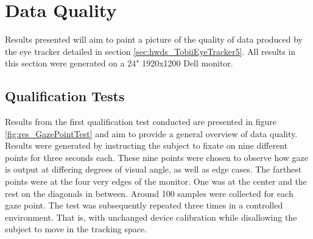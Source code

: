 \section{Data Quality} \label{sec:res_DataQuality}


Results presented will aim to paint a picture of the quality of data produced by the eye tracker detailed in section \ref{sec:hwds_TobiiEyeTracker5}. All results in this section were generated on a 24" 1920x1200 Dell monitor.

\subsection{Qualification Tests}

Results from the first qualification test conducted are presented in figure \ref{fig:res_GazePointTest} and aim to provide a general overview of data quality. Results were generated by instructing the subject to fixate on nine different points for three seconds each. These nine points were chosen to observe how gaze is output at differing degrees of visual angle, as well as edge cases. The farthest points were at the four very edges of the monitor. One was at the center and the rest on the diagonals in between. Around 100 samples were collected for each gaze point. The test was subsequently repeated three times in a controlled environment. That is, with unchanged device calibration while disallowing the subject to move in the tracking space.


